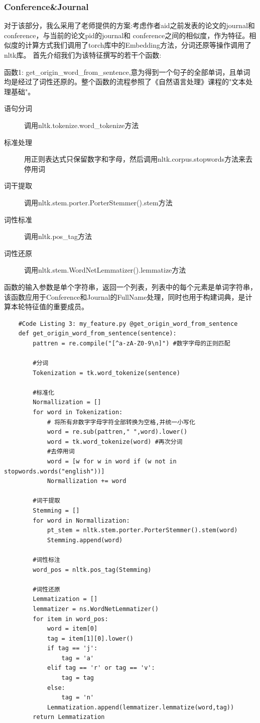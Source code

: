 \documentclass{mcmthesis}
\begin{document}
		\subsubsection{Conference\&Journal}
			对于该部分，我么采用了老师提供的方案:考虑作者aid之前发表的论文的journal和conference，与当前的论文pid的journal和
			conference之间的相似度，作为特征。相似度的计算方式我们调用了torch库中的Embedding方法，分词还原等操作调用了nltk库。
			首先介绍我们为该特征撰写的若干个函数:
			\par 函数1: get\_origin\_word\_from\_sentence,意为得到一个句子的全部单词，且单词均是经过了词性还原的。整个函数的流程参照了《自然语言处理》课程的"文本处理基础"。
			\begin{description}
				\item [\qquad 语句分词]调用nltk.tokenize.word\_tokenize方法
				\item [\qquad 标准处理]用正则表达式只保留数字和字母，然后调用nltk.corpus.stopwords方法来去停用词
				\item [\qquad 词干提取]调用nltk.stem.porter.PorterStemmer().stem方法
				\item [\qquad 词性标准]调用nltk.pos\_tag方法
				\item [\qquad 词性还原]调用nltk.stem.WordNetLemmatizer().lemmatize方法
			\end{description}
			函数的输入参数是单个字符串，返回一个列表，列表中的每个元素是单词字符串，该函数应用于Conference和Journal的FullName处理，同时也用于构建词典，是计算本轮特征值的重要成员。
			{\setmainfont{Courier New Bold}              
				\begin{lstlisting}
	#Code Listing 3: my_feature.py @get_origin_word_from_sentence
	def get_origin_word_from_sentence(sentence):
		pattren = re.compile("[^a-zA-Z0-9\n]") #数字字母的正则匹配
	
		#分词    
		Tokenization = tk.word_tokenize(sentence) 
	
		#标准化
		Normallization = []
		for word in Tokenization:
			# 将所有非数字字母字符全部转换为空格,并统一小写化
			word = re.sub(pattren," ",word).lower()
			word = tk.word_tokenize(word) #再次分词
			#去停用词
			word = [w for w in word if (w not in stopwords.words("english"))]
			Normallization += word
	
		#词干提取
		Stemming = []
		for word in Normallization:
			pt_stem = nltk.stem.porter.PorterStemmer().stem(word)
			Stemming.append(word)
	
		#词性标注
		word_pos = nltk.pos_tag(Stemming)
		
		#词性还原
		Lemmatization = []
		lemmatizer = ns.WordNetLemmatizer()
		for item in word_pos:
			word = item[0]
			tag = item[1][0].lower()
			if tag == 'j':
				tag = 'a'
			elif tag == 'r' or tag == 'v':
				tag = tag
			else:
				tag = 'n'
			Lemmatization.append(lemmatizer.lemmatize(word,tag))
		return Lemmatization
				\end{lstlisting}
			}
\end{document}
